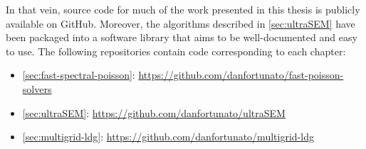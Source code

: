 
In that vein, source code for much of the work presented in this thesis is publicly available on GitHub. Moreover, the algorithms described in \cref{sec:ultraSEM} have been packaged into a software library that aims to be well-documented and easy to use. The following repositories contain code corresponding to each chapter:

\begin{itemize}
\item \cref{sec:fast-spectral-poisson}: \url{https://github.com/danfortunato/fast-poisson-solvers}
\item \cref{sec:ultraSEM}: \url{https://github.com/danfortunato/ultraSEM}
\item \cref{sec:multigrid-ldg}: \url{https://github.com/danfortunato/multigrid-ldg}
\end{itemize}
